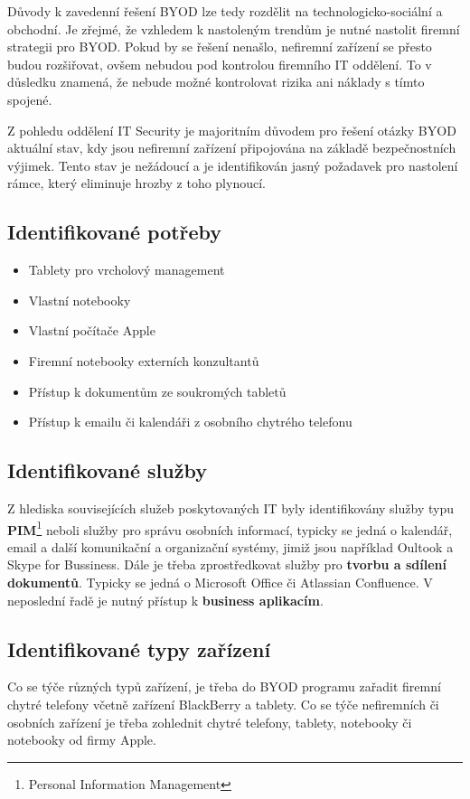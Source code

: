 Důvody k zavedenní řešení BYOD lze tedy rozdělit na technologicko-sociální a obchodní. Je zřejmé, že vzhledem k nastoleným trendům je nutné nastolit firemní strategii pro BYOD. Pokud by se řešení nenašlo, nefiremní zařízení se přesto budou rozšiřovat, ovšem nebudou pod kontrolou firemního IT oddělení. To v důsledku znamená, že nebude možné kontrolovat rizika ani náklady s tímto spojené. 

Z pohledu oddělení IT Security je majoritním důvodem pro řešení otázky BYOD aktuální stav, kdy jsou nefiremní zařízení připojována na základě bezpečnostních výjimek. Tento stav je nežádoucí a je identifikován jasný požadavek pro nastolení rámce, který eliminuje hrozby z toho plynoucí.


\subsection{Identifikované potřeby}\label{identifikovanePotreby}
\begin{itemize}
    \item Tablety pro vrcholový management
    \item Vlastní notebooky
    \item Vlastní počítače Apple
    \item Firemní notebooky externích konzultantů
    \item Přístup k dokumentům ze soukromých tabletů
    \item Přístup k emailu či kalendáři z osobního chytrého telefonu
\end{itemize}

\subsection{Identifikované služby}\label{identifikovaneSluyby}
Z hlediska souvisejících služeb poskytovaných IT byly identifikovány služby typu \textbf{PIM}\footnote{Personal Information Management} neboli služby pro správu osobních informací, typicky se jedná o kalendář, email a další komunikační a organizační systémy, jimiž jsou například Oultook a Skype for Bussiness. Dále je třeba zprostředkovat služby pro \textbf{tvorbu a sdílení dokumentů}. Typicky se jedná o Microsoft Office či Atlassian Confluence. V neposlední řadě je nutný přístup k \textbf{business aplikacím}.

\subsection{Identifikované typy zařízení}
Co se týče různých typů zařízení, je třeba do BYOD programu zařadit firemní chytré telefony včetně zařízení BlackBerry a tablety. Co se týče nefiremních či osobních zařízení je třeba zohlednit chytré telefony, tablety, notebooky či notebooky od firmy Apple.

